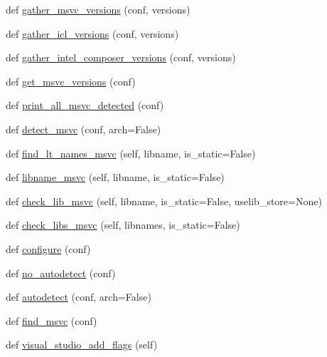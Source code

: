 \begin{DoxyCompactItemize}
\item 
def \hyperlink{namespacewaflib_1_1_tools_1_1msvc_afb920b4d44d2cf1a0c571bdbead2d7ad}{gather\+\_\+msvc\+\_\+versions} (conf, versions)
\item 
def \hyperlink{namespacewaflib_1_1_tools_1_1msvc_a69c07457130fd493f174ddbbd29eafce}{gather\+\_\+icl\+\_\+versions} (conf, versions)
\item 
def \hyperlink{namespacewaflib_1_1_tools_1_1msvc_a03b2739135f225e530b0272fa62c05de}{gather\+\_\+intel\+\_\+composer\+\_\+versions} (conf, versions)
\item 
def \hyperlink{namespacewaflib_1_1_tools_1_1msvc_a5f32cceb3c4842a224fb09d9d3a1d8f8}{get\+\_\+msvc\+\_\+versions} (conf)
\item 
def \hyperlink{namespacewaflib_1_1_tools_1_1msvc_aae9744b7e465d33a2b06ac41e14aa88e}{print\+\_\+all\+\_\+msvc\+\_\+detected} (conf)
\item 
def \hyperlink{namespacewaflib_1_1_tools_1_1msvc_a7adf5c56dbfc937e2923df5aa71b2087}{detect\+\_\+msvc} (conf, arch=False)
\item 
def \hyperlink{namespacewaflib_1_1_tools_1_1msvc_ad777b6d5d98f37e7a5d020c657d17da8}{find\+\_\+lt\+\_\+names\+\_\+msvc} (self, libname, is\+\_\+static=False)
\item 
def \hyperlink{namespacewaflib_1_1_tools_1_1msvc_a32b62a01e3283caae31fa9d7d8372d0b}{libname\+\_\+msvc} (self, libname, is\+\_\+static=False)
\item 
def \hyperlink{namespacewaflib_1_1_tools_1_1msvc_a714b88608b6a79e74d6393e1b8a1da0f}{check\+\_\+lib\+\_\+msvc} (self, libname, is\+\_\+static=False, uselib\+\_\+store=None)
\item 
def \hyperlink{namespacewaflib_1_1_tools_1_1msvc_af4be6dfee11a1812dd2f458e782afabb}{check\+\_\+libs\+\_\+msvc} (self, libnames, is\+\_\+static=False)
\item 
def \hyperlink{namespacewaflib_1_1_tools_1_1msvc_ae7b47fda406289f0cfa519a383f06a01}{configure} (conf)
\item 
def \hyperlink{namespacewaflib_1_1_tools_1_1msvc_af06d3c92ed056902afe0287918dbbe6d}{no\+\_\+autodetect} (conf)
\item 
def \hyperlink{namespacewaflib_1_1_tools_1_1msvc_a9c695245f349965fd6aacf868589e7bf}{autodetect} (conf, arch=False)
\item 
def \hyperlink{namespacewaflib_1_1_tools_1_1msvc_a8f9c87e3929e466da896514026ec0b6a}{find\+\_\+msvc} (conf)
\item 
def \hyperlink{namespacewaflib_1_1_tools_1_1msvc_a2612f0340f9749fa3aaa1da5a4f758da}{visual\+\_\+studio\+\_\+add\+\_\+flags} (self)

\end{DoxyCompactItemize}
